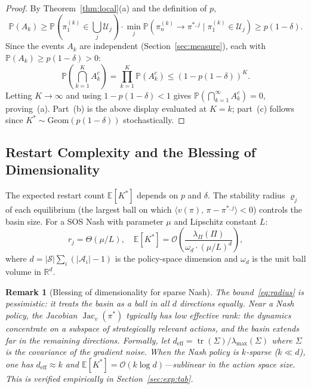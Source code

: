 \documentclass{article}
\newtheorem{remark}[theorem]{Remark}
\newcommand{\R}{\mathbb{R}}
\newcommand{\E}{\mathbb{E}}
\newcommand{\Prob}{\mathbb{P}}
\newcommand{\calS}{\mathcal{S}}
\newcommand{\calA}{\mathcal{A}}
\newcommand{\calU}{\mathcal{U}}
\newcommand{\ip}[2]{\langle #1,\, #2 \rangle}
\begin{document}
\begin{proof}
By Theorem~\ref{thm:local}(a) and the definition of $p$,
\begin{equation}
  \Prob(A_k) \ge \Prob\!\left(\pi_1^{(k)} \in \textstyle\bigcup_j \calU_j\right)
  \cdot \min_j \Prob\!\left(\pi_n^{(k)} \to \pi^{*,j}
    \mid \pi_1^{(k)} \in \calU_j\right) \ge p(1-\delta).
\end{equation}
Since the events $A_k$ are independent (Section~\ref{sec:measure}),
each with $\Prob(A_k) \ge p(1-\delta) > 0$:
\begin{equation}
  \Prob\!\left(\bigcap_{k=1}^K A_k^c\right)
  = \prod_{k=1}^K \Prob(A_k^c)
  \le (1 - p(1-\delta))^K.
\end{equation}
Letting $K \to \infty$ and using $1 - p(1-\delta) < 1$ gives
$\Prob(\bigcap_{k=1}^\infty A_k^c) = 0$, proving~(a). Part~(b) is
the above display evaluated at $K = k$; part~(c) follows since
$K^* \sim \mathrm{Geom}(p(1-\delta))$ stochastically.
\end{proof}

\subsection{Restart Complexity and the Blessing of Dimensionality}
\label{sec:complexity}

The expected restart count $\E[K^*]$ depends on $p$ and $\delta$.
The stability radius $\varrho_j$ of each equilibrium (the largest ball
on which $\ip{v(\pi)}{\pi - \pi^{*,j}} < 0$) controls the basin size.
For a SOS Nash with parameter $\mu$ and Lipschitz constant $L$:
\begin{equation}
  \label{eq:radius}
  r_j = \Theta(\mu/L), \quad
  \E[K^*] = \mathcal{O}\!\left(
    \frac{\lambda_\Pi(\Pi)}{\omega_d \cdot (\mu/L)^d}
  \right),
\end{equation}
where $d = |\calS| \sum_i (|\calA_i| - 1)$ is the policy-space
dimension and $\omega_d$ is the unit ball volume in $\R^d$.

\begin{remark}[Blessing of dimensionality for sparse Nash]
\label{rem:blessing}
The bound~\eqref{eq:radius} is pessimistic: it treats the basin as a
ball in all $d$ directions equally. Near a Nash policy, the Jacobian
$\operatorname{Jac}_v(\pi^*)$ typically has low effective rank: the
dynamics concentrate on a subspace of \emph{strategically relevant}
actions, and the basin extends far in the remaining directions.
Formally, let $d_{\mathrm{eff}} = \operatorname{tr}(\Sigma)/\lambda_{\max}(\Sigma)$
where $\Sigma$ is the covariance of the gradient noise. When the Nash
policy is $k$-sparse ($k \ll d$), one has $d_{\mathrm{eff}} \approx k$
and $\E[K^*] = \mathcal{O}(k \log d)$---sublinear in the action space
size. This is verified empirically in Section~\ref{sec:exp:tab}.
\end{remark}
\end{document}
